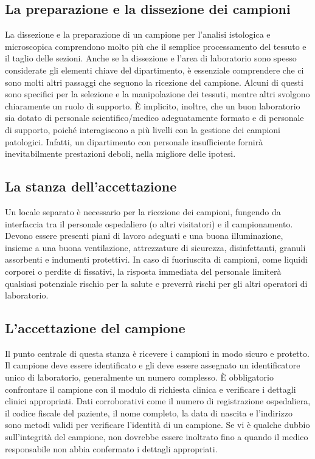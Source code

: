\subsection{La preparazione e la dissezione dei campioni}
La dissezione e la preparazione di un campione per l'analisi istologica e microscopica comprendono molto più che il semplice processamento del tessuto e il taglio delle sezioni. Anche se la dissezione e l'area di laboratorio sono spesso considerate gli elementi chiave del dipartimento, è essenziale comprendere che ci sono molti altri passaggi che seguono la ricezione del campione. Alcuni di questi sono specifici per la selezione e la manipolazione dei tessuti, mentre altri svolgono chiaramente un ruolo di supporto. È implicito, inoltre, che un buon laboratorio sia dotato di personale scientifico/medico adeguatamente formato e di personale di supporto, poiché interagiscono a più livelli con la gestione dei campioni patologici. Infatti, un dipartimento con personale insufficiente fornirà inevitabilmente prestazioni deboli, nella migliore delle ipotesi.

\subsection{La stanza dell'accettazione}
Un locale separato è necessario per la ricezione dei campioni, fungendo da interfaccia tra il personale ospedaliero (o altri visitatori) e il  campionamento. Devono essere presenti piani di lavoro adeguati e una buona illuminazione, insieme a una buona ventilazione, attrezzature di sicurezza, disinfettanti, granuli assorbenti e indumenti protettivi. In caso di fuoriuscita di campioni, come liquidi corporei o perdite di fissativi, la risposta immediata del personale limiterà qualsiasi potenziale rischio per la salute e preverrà rischi per gli altri operatori di laboratorio.

\subsection{L'accettazione del campione}
Il punto centrale di questa stanza è ricevere i campioni in modo sicuro e protetto. Il campione deve essere identificato e gli deve essere assegnato un identificatore unico di laboratorio, generalmente un numero complesso. È obbligatorio confrontare il campione con il modulo di richiesta clinica e verificare i dettagli clinici appropriati. Dati corroborativi come il numero di registrazione ospedaliera, il codice fiscale del paziente, il nome completo, la data di nascita e l'indirizzo sono metodi validi per verificare l'identità di un campione. Se vi è qualche dubbio sull'integrità del campione, non dovrebbe essere inoltrato fino a quando il medico responsabile non abbia confermato i dettagli appropriati.

